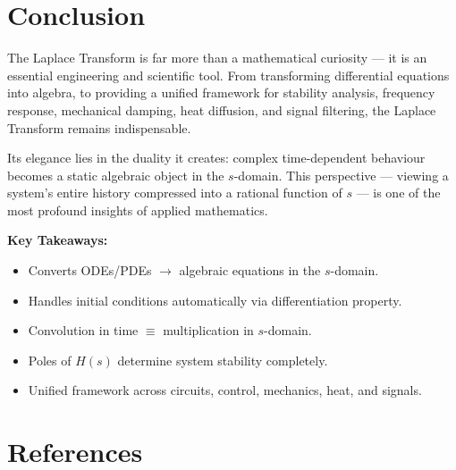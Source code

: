 \documentclass[12pt]{article}
\begin{document}
\section{Conclusion}

The Laplace Transform is far more than a mathematical curiosity --- it is an essential engineering
and scientific tool. From transforming differential equations into algebra, to providing a unified
framework for stability analysis, frequency response, mechanical damping, heat diffusion, and signal
filtering, the Laplace Transform remains indispensable.

Its elegance lies in the duality it creates: complex time-dependent behaviour becomes a static
algebraic object in the $s$-domain. This perspective --- viewing a system's entire history
compressed into a rational function of $s$ --- is one of the most profound insights of applied
mathematics.

\begin{answerbox}
\textbf{Key Takeaways:}
\begin{itemize}[noitemsep, topsep=4pt]
  \item Converts ODEs/PDEs $\to$ algebraic equations in the $s$-domain.
  \item Handles initial conditions automatically via differentiation property.
  \item Convolution in time $\equiv$ multiplication in $s$-domain.
  \item Poles of $H(s)$ determine system stability completely.
  \item Unified framework across circuits, control, mechanics, heat, and signals.
\end{itemize}
\end{answerbox}

\vspace{14pt}

\section*{References}
\end{document}
